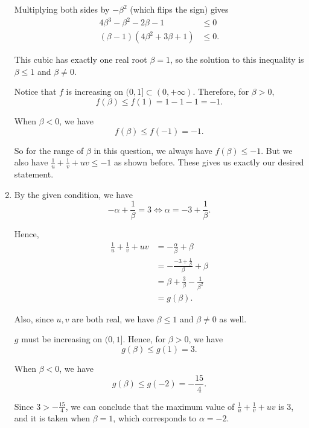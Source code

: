 \begin{enumerate}
          Multiplying both sides by \(-\beta^2\) (which flips the sign) gives
          \begin{align*}
              4\beta^3 - \beta^2 - 2\beta - 1    & \leq 0  \\
              (\beta - 1)(4\beta^2 + 3\beta + 1) & \leq 0.
          \end{align*}

          This cubic has exactly one real root \(\beta = 1\), so the solution to this inequality is \(\beta \leq 1\) and \(\beta \neq 0\).

          Notice that \(f\) is increasing on \((0, 1] \subset (0, +\infty)\). Therefore, for \(\beta > 0\),
          \[
              f(\beta) \leq f(1) = 1 - 1 - 1 = -1.
          \]

          When \(\beta < 0\), we have
          \[
              f(\beta) \leq f(-1) = -1.
          \]

          So for the range of \(\beta\) in this question, we always have \(f(\beta) \leq -1\). But we also have \(\frac{1}{u} + \frac{1}{v} + uv \leq -1\) as shown before. These gives us exactly our desired statement.

    \item By the given condition, we have
          \[
              -\alpha + \frac{1}{\beta} = 3 \iff \alpha = -3 + \frac{1}{\beta}.
          \]

          Hence,
          \begin{align*}
              \frac{1}{u} + \frac{1}{v} + uv & = - \frac{\alpha}{\beta} + \beta               \\
                                             & = - \frac{-3 + \frac{1}{\beta}}{\beta} + \beta \\
                                             & = \beta + \frac{3}{\beta} - \frac{1}{\beta^2}  \\
                                             & = g(\beta).
          \end{align*}

          Also, since \(u, v\) are both real, we have \(\beta \leq 1\) and \(\beta \neq 0\) as well.

          \(g\) must be increasing on \((0, 1]\). Hence, for \(\beta > 0\), we have
          \[
              g(\beta) \leq g(1) = 3.
          \]

          When \(\beta < 0\), we have
          \[
              g(\beta) \leq g(-2) = -\frac{15}{4}.
          \]

          Since \(3 > -\frac{15}{4}\), we can conclude that the maximum value of \(\frac{1}{u} + \frac{1}{v} + uv\) is \(3\), and it is taken when \(\beta = 1\), which corresponds to \(\alpha = -2\).

\end{enumerate}